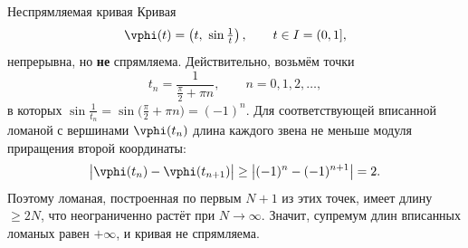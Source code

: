 \begin{Example}{Неспрямляемая кривая}{}
	Кривая
	\[
	\vphi(t)=\left(t,\ \sin\tfrac1t\right),\qquad t\in I=(0,1],
	\]
	непрерывна, но \textbf{не} спрямляема. 
	Действительно, возьмём точки
	\[
	t_n=\frac{1}{\tfrac{\pi}{2}+\pi n},\qquad n=0,1,2,\dots,
	\]
	в которых $\sin\frac1{t_n}=\sin\!\bigl(\tfrac{\pi}{2}+\pi n\bigr)=(-1)^n$.
	Для соответствующей вписанной ломаной с вершинами $\vphi(t_n)$ длина каждого
	звена не меньше модуля приращения второй координаты:
	\[
	\bigl|\vphi(t_n)-\vphi(t_{n+1})\bigr|\ge\bigl|(-1)^n-(-1)^{n+1}\bigr|=2.
	\]
	Поэтому ломаная, построенная по первым $N+1$ из этих точек, имеет длину
	$\ge 2N$, что неограниченно растёт при $N\to\infty$. Значит, супремум длин
	вписанных ломаных равен $+\infty$, и кривая не спрямляема.
\end{Example}

